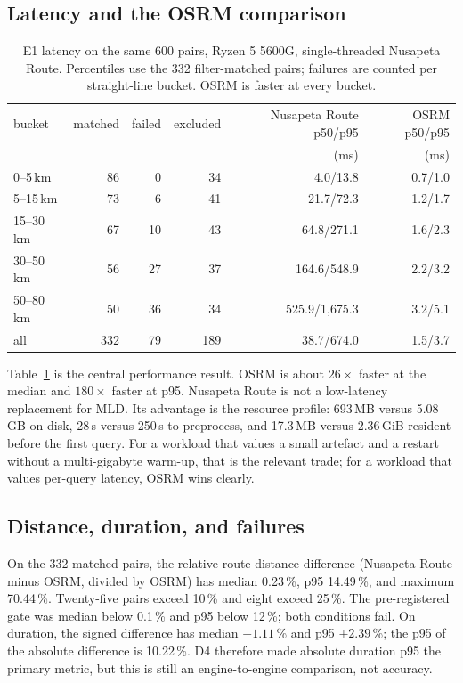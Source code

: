 \documentclass[sigconf,nonacm]{acmart}
\begin{document}
\subsection{Latency and the OSRM comparison}
\begin{table}[t]
\footnotesize
\begin{tabular}{@{}lrrrrr@{}}
\toprule
bucket & matched & failed & excluded & Nusapeta Route p50/p95 & OSRM p50/p95 \\
       &         &        &          & (ms)            & (ms) \\
\midrule
0--5\,km   & 86 &  0 & 34 &   4.0/13.8 & 0.7/1.0 \\
5--15\,km  & 73 &  6 & 41 &  21.7/72.3 & 1.2/1.7 \\
15--30\,km & 67 & 10 & 43 &  64.8/271.1 & 1.6/2.3 \\
30--50\,km & 56 & 27 & 37 & 164.6/548.9 & 2.2/3.2 \\
50--80\,km & 50 & 36 & 34 & 525.9/1{,}675.3 & 3.2/5.1 \\
\midrule
all        & 332 & 79 & 189 & 38.7/674.0 & 1.5/3.7 \\
\bottomrule
\end{tabular}
\caption{E1 latency on the same 600 pairs, Ryzen 5 5600G, single-threaded
Nusapeta Route. Percentiles use the 332 filter-matched pairs; failures are counted per
straight-line bucket. OSRM is faster at every bucket.}
\label{tab:e1lat}
\end{table}

Table~\ref{tab:e1lat} is the central performance result. OSRM is about
$26\times$ faster at the median and $180\times$ faster at p95. Nusapeta Route is not a
low-latency replacement for MLD. Its advantage is the resource profile: 693\,MB
versus 5.08\,GB on disk, 28\,s versus 250\,s to preprocess, and 17.3\,MB versus
2.36\,GiB resident before the first query. For a workload that values a small
artefact and a restart without a multi-gigabyte warm-up, that is the relevant
trade; for a workload that values per-query latency, OSRM wins clearly.

\subsection{Distance, duration, and failures}
On the 332 matched pairs, the relative route-distance difference (Nusapeta Route minus
OSRM, divided by OSRM) has median 0.23\,\%, p95 14.49\,\%, and maximum 70.44\,\%.
Twenty-five pairs exceed 10\,\% and eight exceed 25\,\%. The pre-registered gate
was median below 0.1\,\% and p95 below 12\,\%; both conditions fail. On duration,
the signed difference has median $-1.11$\,\% and p95 $+2.39$\,\%; the p95 of the
absolute difference is 10.22\,\%. D4 therefore made absolute duration p95 the
primary metric, but this is still an engine-to-engine comparison, not accuracy.
\end{document}
